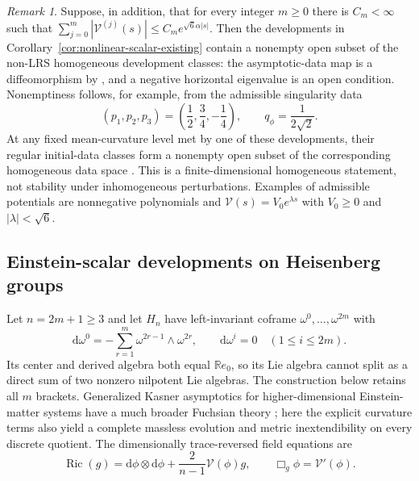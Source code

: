 \documentclass[10pt,a4paper]{article}
\numberwithin{equation}{section}
\theoremstyle{definition}
\theoremstyle{remark}
\newtheorem{remark}[theorem]{Remark}
\newcommand{\R}{\mathbb R}
\newcommand{\dd}{\mathrm d}
\newcommand{\Ric}{\operatorname{Ric}}
\begin{document}
\begin{remark}\label{rem:nonlinear-open-sectors}
Suppose, in addition, that for every integer $m\ge0$ there is $C_m<\infty$
such that
$\sum_{j=0}^m|\mathcal V^{(j)}(s)|\le C_m e^{\sqrt6\alpha|s|}$.
Then the developments in Corollary~\ref{cor:nonlinear-scalar-existing}
contain a nonempty open subset of the non-LRS homogeneous
development classes: the asymptotic-data map is a diffeomorphism by
\cite[Corollary~1.88]{Ringstrom2025}, and a negative horizontal eigenvalue
is an open condition.  Nonemptiness follows, for example, from the
admissible singularity data
\[
 (p_1,p_2,p_3)=\left(\frac12,\frac34,-\frac14\right),
 \qquad q_\phi=\frac{1}{2\sqrt2}.
\]
At any fixed mean-curvature level met by one of these developments,
their regular initial-data classes form a nonempty open subset of
the corresponding homogeneous data space
\cite[Proposition~1.70]{Ringstrom2025}.  This is a finite-dimensional
homogeneous statement, not stability under inhomogeneous perturbations.
Examples of admissible potentials are nonnegative polynomials and
$\mathcal V(s)=V_0e^{\lambda s}$ with $V_0\ge0$ and $|\lambda|<\sqrt6$.
\end{remark}

\subsection{Einstein-scalar developments on Heisenberg groups}
\label{subsec:h5-einstein}

Let $n=2m+1\ge3$ and let $H_n$ have left-invariant coframe
$\omega^0,\ldots,\omega^{2m}$ with
\begin{equation}
 \dd\omega^0=-\sum_{r=1}^m\omega^{2r-1}\wedge\omega^{2r},
 \qquad \dd\omega^i=0\quad(1\le i\le2m).
 \label{eq:h5-coframe}
\end{equation}
Its center and derived algebra both equal $\R e_0$, so its Lie algebra
cannot split as a direct sum of two nonzero nilpotent Lie algebras.
The construction below retains all $m$ brackets.  Generalized Kasner
asymptotics for higher-dimensional Einstein-matter systems have a much
broader Fuchsian theory \cite{DamourHenneauxRendallWeaver2002}; here the
explicit curvature terms also yield a complete massless evolution and
metric inextendibility on every discrete quotient.
The dimensionally trace-reversed field equations are
\begin{equation}
 \Ric(g)=\dd\phi\otimes\dd\phi+
       \frac{2}{n-1}\mathcal V(\phi)g,
 \qquad \Box_g\phi=\mathcal V'(\phi).
 \label{eq:h5-field-equations}
\end{equation}
\end{document}
